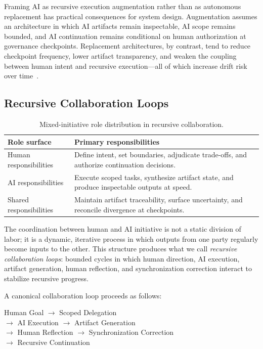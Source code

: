 Framing AI as recursive execution augmentation rather than as autonomous replacement has practical consequences for system design. Augmentation assumes an architecture in which AI artifacts remain inspectable, AI scope remains bounded, and AI continuation remains conditional on human authorization at governance checkpoints. Replacement architectures, by contrast, tend to reduce checkpoint frequency, lower artifact transparency, and weaken the coupling between human intent and recursive execution---all of which increase drift risk over time~\cite{Shneiderman2020HCAI,Amershi2014InteractiveML}.

\subsection{Recursive Collaboration Loops}

\begin{table}[H]
  \centering
  \small
  \caption{Mixed-initiative role distribution in recursive collaboration.}
  \label{tab:mixed-initiative-roles}
  \begin{tabularx}{\linewidth}{l X}
    \toprule
    \textbf{Role surface} & \textbf{Primary responsibilities} \\
    \midrule
    Human responsibilities & Define intent, set boundaries, adjudicate trade-offs, and authorize continuation decisions. \\
    AI responsibilities & Execute scoped tasks, synthesize artifact state, and produce inspectable outputs at speed. \\
    Shared responsibilities & Maintain artifact traceability, surface uncertainty, and reconcile divergence at checkpoints. \\
    \bottomrule
  \end{tabularx}
\end{table}

The coordination between human and AI initiative is not a static division of labor; it is a dynamic, iterative process in which outputs from one party regularly become inputs to the other. This structure produces what we call \textit{recursive collaboration loops}: bounded cycles in which human direction, AI execution, artifact generation, human reflection, and synchronization correction interact to stabilize recursive progress.

A canonical collaboration loop proceeds as follows:
\begin{center}
Human Goal $\rightarrow$ Scoped Delegation\\
$\rightarrow$ AI Execution $\rightarrow$ Artifact Generation\\
$\rightarrow$ Human Reflection $\rightarrow$ Synchronization Correction\\
$\rightarrow$ Recursive Continuation
\end{center}


